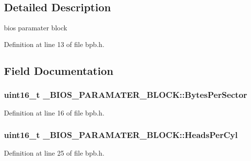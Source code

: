 \subsection{Detailed Description}
bios paramater block 

Definition at line 13 of file bpb.\+h.



\subsection{Field Documentation}
\subsubsection[{\texorpdfstring{Bytes\+Per\+Sector}{BytesPerSector}}]{\setlength{\rightskip}{0pt plus 5cm}uint16\+\_\+t \+\_\+\+B\+I\+O\+S\+\_\+\+P\+A\+R\+A\+M\+A\+T\+E\+R\+\_\+\+B\+L\+O\+C\+K\+::\+Bytes\+Per\+Sector}\hypertarget{struct__BIOS__PARAMATER__BLOCK_a66104ad70bc3243f824e6d3a5203017d}{}\label{struct__BIOS__PARAMATER__BLOCK_a66104ad70bc3243f824e6d3a5203017d}


Definition at line 16 of file bpb.\+h.

\subsubsection[{\texorpdfstring{Heads\+Per\+Cyl}{HeadsPerCyl}}]{\setlength{\rightskip}{0pt plus 5cm}uint16\+\_\+t \+\_\+\+B\+I\+O\+S\+\_\+\+P\+A\+R\+A\+M\+A\+T\+E\+R\+\_\+\+B\+L\+O\+C\+K\+::\+Heads\+Per\+Cyl}\hypertarget{struct__BIOS__PARAMATER__BLOCK_a71a6800e1d31abe25b353b5b9b84c545}{}\label{struct__BIOS__PARAMATER__BLOCK_a71a6800e1d31abe25b353b5b9b84c545}


Definition at line 25 of file bpb.\+h.

